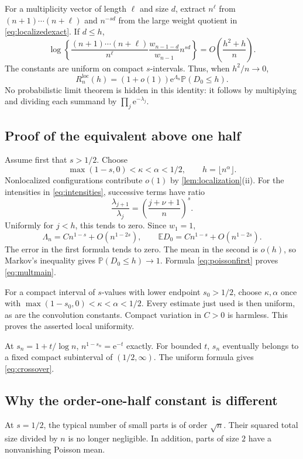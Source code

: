 \documentclass[11pt,a4paper]{article}
\theoremstyle{definition}
\theoremstyle{remark}
\newcommand{\ee}{\mathrm e}
\newcommand{\Prob}{\mathbb P}
\newcommand{\Exp}{\mathbb E}
\numberwithin{equation}{section}
\begin{document}
For a multiplicity vector of length $\ell$ and size $d$, extract
$n^\ell$ from $(n+1)\cdots(n+\ell)$ and $n^{-sd}$ from the large
weight quotient in \eqref{eq:localizedexact}. If $d\le h$,
\begin{equation}
 \log\left\{\frac{(n+1)\cdots(n+\ell)}{n^\ell}
       \frac{w_{n-1-d}}{w_{n-1}}n^{sd}\right\}
 =O\left(\frac{h^2+h}{n}\right).
 \label{eq:uniformfactor}
\end{equation}
The constants are uniform on compact $s$-intervals.
Thus, when $h^2/n\to0$,
\begin{equation}
 R_n^{\mathrm{loc}}(h)
 =(1+o(1))\ee^{\Lambda_n}\Prob(D_0\le h).
 \label{eq:poissonfirst}
\end{equation}
No probabilistic limit theorem is hidden in this identity: it follows by
multiplying and dividing each summand by $\prod_j\ee^{-\lambda_j}$.

\subsection{Proof of the equivalent above one half}
Assume first that $s>1/2$. Choose
\[
 \max(1-s,0)<\kappa<\alpha<1/2,\qquad h=\lfloor n^\alpha\rfloor.
\]
Nonlocalized configurations contribute $o(1)$ by
\cref{lem:localization}(ii). For the intensities in
\eqref{eq:intensities}, successive terms have ratio
\[
 \frac{\lambda_{j+1}}{\lambda_j}
 =\left(\frac{j+\nu+1}{n}\right)^s.
\]
Uniformly for $j<h$, this tends to zero. Since $w_1=1$,
\begin{equation}
 \Lambda_n=Cn^{1-s}+O(n^{1-2s}),\qquad
 \Exp D_0=Cn^{1-s}+O(n^{1-2s}).
 \label{eq:poissonmeans}
\end{equation}
The error in the first formula tends to zero. The mean in the second is
$o(h)$, so Markov's inequality gives $\Prob(D_0\le h)\to1$.
Formula \eqref{eq:poissonfirst} proves \eqref{eq:multmain}.

For a compact interval of $s$-values with lower endpoint $s_0>1/2$,
choose $\kappa,\alpha$ once with
$\max(1-s_0,0)<\kappa<\alpha<1/2$. Every estimate just used is then
uniform, as are the convolution constants. Compact variation in $C>0$
is harmless. This proves the asserted local uniformity.

At $s_n=1+t/\log n$, $n^{1-s_n}=\ee^{-t}$ exactly. For bounded $t$,
$s_n$ eventually belongs to a fixed compact subinterval of
$(1/2,\infty)$. The uniform formula gives \eqref{eq:crossover}.

\subsection{Why the order-one-half constant is different}
At $s=1/2$, the typical number of small parts is of order $\sqrt n$.
Their squared total size divided by $n$ is no longer negligible. In
addition, parts of size $2$ have a nonvanishing Poisson mean.
\end{document}
